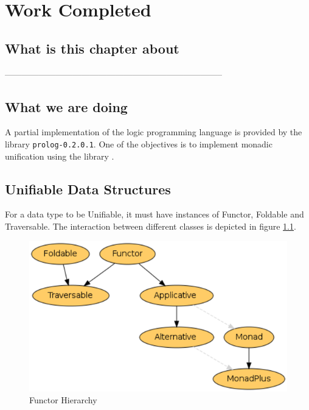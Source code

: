 \documentclass[thesis-solanki.tex]{subfiles}
\begin{document}
\chapter{Work Completed}\label{chap:workCompleted}


\section{What is this chapter about}

-----------------------------------------------------------------------------


\section{What we are doing}
A partial implementation of the logic programming language  is provided by the library \texttt{prolog-0.2.0.1}. One of the 
objectives is to implement monadic unification using the library \cite{unification-fd-lib}. 


\section{Unifiable Data Structures}
For a data type to be Unifiable, it must have instances of Functor, Foldable and Traversable. The interaction between different classes is 
depicted in figure \ref{fig:Functor Hierarchy}.

\begin{figure}[th]
\centering
\includegraphics[scale = 0.7]{FunctorHierarchy.png}
\caption{Functor Hierarchy \cite{website:foldablenadtraversable}}
\label{fig:Functor Hierarchy}
\end{figure}  
\end{document}

